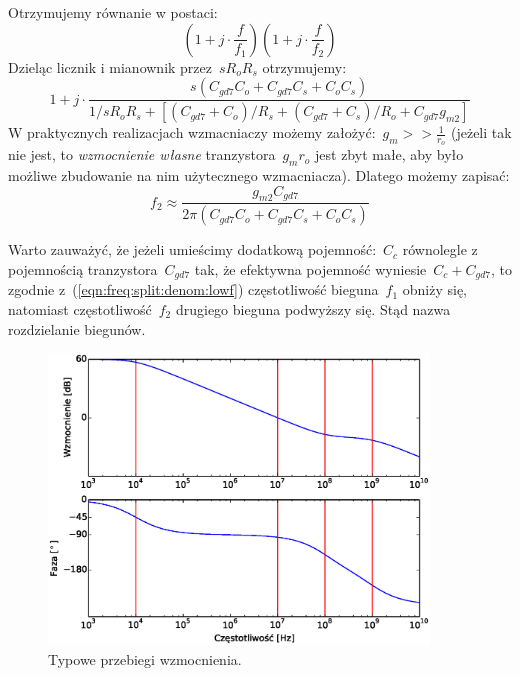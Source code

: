 \documentclass[twoside,pl,final]{labman}
\begin{document}
Otrzymujemy równanie w postaci:
\begin{equation}
  (1 + j \cdot \frac{f}{f_1})(1 + j \cdot \frac{f}{f_2})
\end{equation}
Dzieląc licznik i mianownik przez~$s R_o R_s$ otrzymujemy:
\begin{equation}
  1 + j \cdot \frac{s(C_{gd7} C_o + C_{gd7} C_s + C_o C_s)}
    {1 / s R_o R_s + [(C_{gd7} + C_o) / R_s +
                      (C_{gd7} + C_s) / R_o + C_{gd7} g_{m2}]}
\end{equation}
W praktycznych realizacjach wzmacniaczy możemy założyć:~$g_m >> \frac{1}{r_o}$
(jeżeli tak nie jest, to \emph{wzmocnienie własne}
tranzystora~$g_m r_o$ jest zbyt małe,
aby było możliwe zbudowanie na nim użytecznego wzmacniacza).
Dlatego możemy zapisać:
\begin{equation}
  f_2 \approx \frac{g_{m2} C_{gd7}}{2 \pi (C_{gd7} C_o + C_{gd7} C_s + C_o C_s)}
  \label{eqn:freq:split:denom:highf}
\end{equation}

Warto zauważyć, że jeżeli umieścimy dodatkową pojemność:~$C_c$
równolegle z pojemnością tranzystora~$C_{gd7}$ tak,
że efektywna pojemność wyniesie~$C_c + C_{gd7}$, to
zgodnie z~(\ref{eqn:freq:split:denom:lowf})
częstotliwość bieguna~$f_1$ obniży się,
natomiast częstotliwość~$f_2$ drugiego bieguna podwyższy się.
Stąd nazwa rozdzielanie biegunów.

\begin{figure}[!htbp]
  \centering
  \includegraphics[width=0.9\textwidth]{tf}
  \caption{Typowe przebiegi wzmocnienia.}
  \label{fig:freq:split:tf}
\end{figure}
\end{document}
